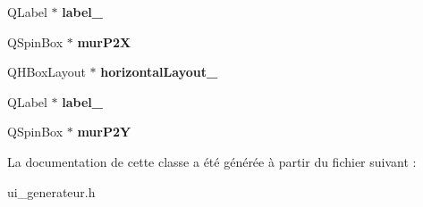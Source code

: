 \begin{DoxyCompactItemize}
\item 
\mbox{\label{class_ui__generateur_ae97cc5810d3f3a25911b0c2e37fe0df5}} 
Q\+Label $\ast$ {\bfseries label\+\_}
\item 
\mbox{\label{class_ui__generateur_a441d7f99a970b4266c4f18d0d236a311}} 
Q\+Spin\+Box $\ast$ {\bfseries mur\+P2X}
\item 
\mbox{\label{class_ui__generateur_ad6afda5ab6ddcb5e932765057c80251f}} 
Q\+H\+Box\+Layout $\ast$ {\bfseries horizontal\+Layout\+\_}
\item 
\mbox{\label{class_ui__generateur_aafb055bf7ae3c7457768352ac2af63a7}} 
Q\+Label $\ast$ {\bfseries label\+\_}
\item 
\mbox{\label{class_ui__generateur_a10522a08d6abacd0ce3b78e3bb7d6b82}} 
Q\+Spin\+Box $\ast$ {\bfseries mur\+P2Y}
\end{DoxyCompactItemize}


La documentation de cette classe a été générée à partir du fichier suivant \+:\begin{DoxyCompactItemize}
\item 
ui\+\_\+generateur.\+h\end{DoxyCompactItemize}
